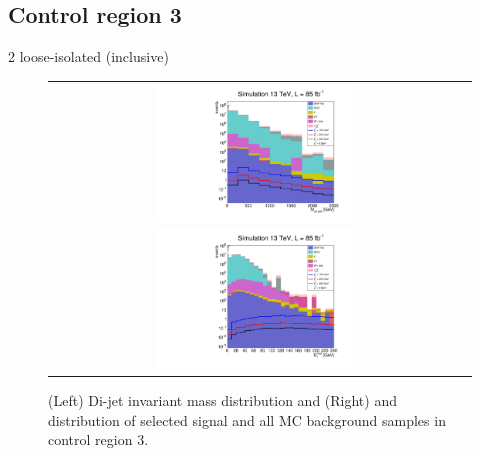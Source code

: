 \subsection*{Control region 3}

\FloatBarrier

2 loose-isolated \hadtau (inclusive)

\begin{figure}[tbh!]
	\centering
	\begin{tabular}{cc}
		\includegraphics[width=0.5\textwidth]{analysis/pics/h_dijetinvariantmass_Tau2LooseIsoInclusive.pdf}
		\includegraphics[width=0.5\textwidth]{analysis/pics/h_met_Tau2LooseIsoInclusive.pdf}
	\end{tabular}
	\caption{(Left) Di-jet invariant mass distribution and (Right) and \met distribution of selected signal and all MC background samples in control region 3.}
	\label{fig::crplots1_Tau2LooseIsoInclusive_13tev}
\end{figure}

